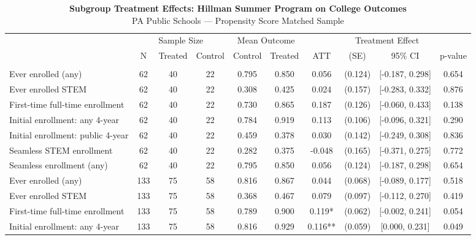 \begin{table}[t]
\caption*{
{\fontsize{10}{12}\selectfont  \textbf{Subgroup Treatment Effects: Hillman Summer Program on College Outcomes}\fontsize{8}{10}\selectfont } \\ 
{\fontsize{8}{10}\selectfont  PA Public Schools — Propensity Score Matched Sample\fontsize{8}{10}\selectfont }
} 
\fontsize{8.0pt}{10.0pt}\selectfont
\begin{tabular*}{\linewidth}{@{\extracolsep{\fill}}l|ccccccccc}
\toprule
 & \multicolumn{3}{c}{Sample Size} & \multicolumn{2}{c}{Mean Outcome} & \multicolumn{4}{c}{Treatment Effect} \\ 
\cmidrule(lr){2-4} \cmidrule(lr){5-6} \cmidrule(lr){7-10}
 & N & Treated & Control & Control & Treated & ATT & (SE) & 95\% CI & p-value \\ 
\midrule\addlinespace[2.5pt]
\multicolumn{10}{l}{{\itshape \textbf{Panel A: Enrollment Outcomes} \emph{(full matched subgroup sample)}}} \\[2.5pt] 
\midrule\addlinespace[2.5pt]
Ever enrolled (any) & {62} & {40} & {22} & {0.795} & {0.850} & {0.056} & {(0.124)} & {[-0.187, 0.298]} & {0.654} \\ 
Ever enrolled STEM & 62 & 40 & 22 & 0.308 & 0.425 & 0.024 & (0.157) & [-0.283, 0.332] & 0.876 \\ 
First-time full-time enrollment & 62 & 40 & 22 & 0.730 & 0.865 & 0.187 & (0.126) & [-0.060, 0.433] & 0.138 \\ 
Initial enrollment: any 4-year & 62 & 40 & 22 & 0.784 & 0.919 & 0.113 & (0.106) & [-0.096, 0.321] & 0.290 \\ 
Initial enrollment: public 4-year & 62 & 40 & 22 & 0.459 & 0.378 & 0.030 & (0.142) & [-0.249, 0.308] & 0.836 \\ 
Seamless STEM enrollment & 62 & 40 & 22 & 0.282 & 0.375 & -0.048 & (0.165) & [-0.371, 0.275] & 0.772 \\ 
Seamless enrollment (any) & 62 & 40 & 22 & 0.795 & 0.850 & 0.056 & (0.124) & [-0.187, 0.298] & 0.654 \\ 
Ever enrolled (any) & 133 & 75 & 58 & 0.816 & 0.867 & 0.044 & (0.068) & [-0.089, 0.177] & 0.518 \\ 
Ever enrolled STEM & 133 & 75 & 58 & 0.368 & 0.467 & 0.079 & (0.097) & [-0.112, 0.270] & 0.419 \\ 
First-time full-time enrollment & 133 & 75 & 58 & 0.789 & 0.900 & 0.119* & (0.062) & [-0.002, 0.241] & 0.054 \\ 
Initial enrollment: any 4-year & 133 & 75 & 58 & 0.816 & 0.929 & 0.116** & (0.059) & [0.000, 0.231] & 0.049 \\ 

\end{tabular*}
\end{table}
